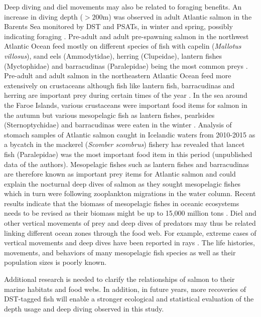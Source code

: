 Deep diving and diel movements may also be related to foraging benefits.
An increase in diving depth ($> 200$m) was observed in adult Atlantic salmon in the Barents Sea monitored by DST and PSATs, in winter and spring, possibly indicating foraging \citep{Hedger2017}. 
Pre-adult and adult pre-spawning salmon in the northwest Atlantic Ocean feed mostly on different species of fish with capelin (\textit{Mallotus villosus}), sand eels (Ammodytidae), herring (Clupeidae), lantern fishes (Myctophidae) and barracudinas (Paralepidae) being the most common preys \citep{Rikardsen2011}. 
Pre-adult and adult salmon in the northeastern Atlantic Ocean feed more extensively on crustaceans although fish like lantern fish, barracudinas and herring are important prey during certain times of the year \citep{Rikardsen2011}. 
In the sea around the Faroe Islands, various crustaceans were important food items for salmon in the autumn but various mesopelagic fish as lantern fishes, pearlsides (Sternoptychidae) and barracudinas were eaten in the winter \citep{Jacobsen2001}. 
Analysis of stomach samples of Atlantic salmon caught in Icelandic waters from 2010-2015 as a bycatch in the mackerel (\textit{Scomber scombrus}) fishery has revealed that lancet fish (Paralepidae) was the most important food item in this period (unpublished data of the authors). 
Mesopelagic fishes such as lantern fishes and barracudinas are therefore known as important prey items for Atlantic salmon and could explain the nocturnal deep dives of salmon as they sought mesopelagic fishes which in turn were  following zooplankton migrations in the water column.
Recent results indicate that the biomass of mesopelagic fishes in oceanic ecosystems needs to be revised as their biomass might be up to 15,000 million tons \citep{Irigoien2014}. 
Diel and other vertical movements of prey and deep dives of predators may thus be related linking different ocean zones through the food web. 
For example, extreme cases of vertical movements and deep dives have been reported in rays \citep{Thorrold2014}. 
The life histories, movements, and behaviors of many mesopelagic fish species as well as their population sizes is poorly known. 

Additional research is needed to clarify the relationships of salmon to their marine habitats and food webs. In addition, in future years, more recoveries of DST-tagged fish will enable a stronger ecological and statistical evaluation of the depth usage and deep diving observed in this study. 

